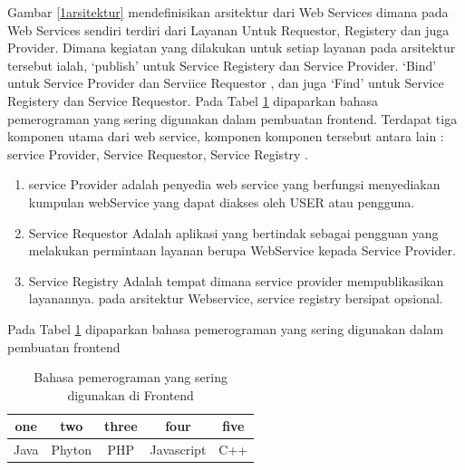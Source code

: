 Gambar \ref{1arsitektur} mendefinisikan arsitektur dari Web Services dimana pada Web Services sendiri terdiri dari Layanan Untuk 
Requestor, Registery dan juga Provider. Dimana kegiatan yang dilakukan untuk setiap layanan pada arsitektur tersebut ialah, `publish' 
untuk Service Registery dan Service Provider. `Bind' untuk Service Provider dan Serviice Requestor , dan juga `Find' untuk Service 
Registery dan Service Requestor. Pada Tabel \ref{1table} dipaparkan bahasa pemerograman yang sering digunakan dalam pembuatan frontend. 
Terdapat tiga komponen utama dari web service, komponen komponen tersebut antara lain :
service Provider, Service Requestor, Service Registry .


\begin{enumerate}
\item service Provider adalah penyedia web service yang berfungsi menyediakan kumpulan webService yang dapat diakses oleh USER atau pengguna.
\item Service Requestor Adalah aplikasi yang bertindak sebagai pengguan yang melakukan permintaan layanan berupa WebService kepada Service Provider.
\item Service Registry Adalah tempat dimana service provider mempublikasikan layanannya. pada arsitektur Webservice, service registry bersipat opsional\cite{kurniawan2015implementasi}.
\end{enumerate}


Pada Tabel \ref{1table} dipaparkan bahasa pemerograman yang sering digunakan dalam pembuatan frontend




\begin{table}[h]
\caption{Bahasa pemerograman yang sering digunakan di Frontend}
\centering
\begin{tabular}{ccccc}
\hline
one&two&three&four&five\\
\hline
Java&Phyton&PHP&Javascript&C++\\
\hline
\end{tabular}
\label{1table}
\end{table}



